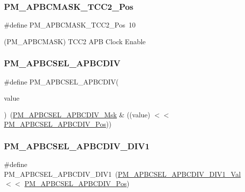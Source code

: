 \subsubsection{\texorpdfstring{PM\_APBCMASK\_TCC2\_Pos}{PM\_APBCMASK\_TCC2\_Pos}}
{\footnotesize\ttfamily \#define P\+M\+\_\+\+A\+P\+B\+C\+M\+A\+S\+K\+\_\+\+T\+C\+C2\+\_\+\+Pos~10}



(P\+M\+\_\+\+A\+P\+B\+C\+M\+A\+SK) T\+C\+C2 A\+PB Clock Enable 

\mbox{\label{group___s_a_m_d21___p_m_ga5f10c12c31b1fe15eee55ac128eaeb7e}} 
\subsubsection{\texorpdfstring{PM\_APBCSEL\_APBCDIV}{PM\_APBCSEL\_APBCDIV}}
{\footnotesize\ttfamily \#define P\+M\+\_\+\+A\+P\+B\+C\+S\+E\+L\+\_\+\+A\+P\+B\+C\+D\+IV(\begin{DoxyParamCaption}\item[{}]{value }\end{DoxyParamCaption})~(\mbox{\hyperlink{group___s_a_m_d21___p_m_ga2619287494a45aef81eafed63ea8463d}{P\+M\+\_\+\+A\+P\+B\+C\+S\+E\+L\+\_\+\+A\+P\+B\+C\+D\+I\+V\+\_\+\+Msk}} \& ((value) $<$$<$ \mbox{\hyperlink{group___s_a_m_d21___p_m_ga4a8379c87e542ce1f35e688187aac873}{P\+M\+\_\+\+A\+P\+B\+C\+S\+E\+L\+\_\+\+A\+P\+B\+C\+D\+I\+V\+\_\+\+Pos}}))}

\mbox{\label{group___s_a_m_d21___p_m_gad92a05127b3c70675bdaecd01e30c335}} 
\subsubsection{\texorpdfstring{PM\_APBCSEL\_APBCDIV\_DIV1}{PM\_APBCSEL\_APBCDIV\_DIV1}}
{\footnotesize\ttfamily \#define P\+M\+\_\+\+A\+P\+B\+C\+S\+E\+L\+\_\+\+A\+P\+B\+C\+D\+I\+V\+\_\+\+D\+I\+V1~(\mbox{\hyperlink{group___s_a_m_d21___p_m_ga765ff4e686958dbc7632b65e5f41e194}{P\+M\+\_\+\+A\+P\+B\+C\+S\+E\+L\+\_\+\+A\+P\+B\+C\+D\+I\+V\+\_\+\+D\+I\+V1\+\_\+\+Val}}   $<$$<$ \mbox{\hyperlink{group___s_a_m_d21___p_m_ga4a8379c87e542ce1f35e688187aac873}{P\+M\+\_\+\+A\+P\+B\+C\+S\+E\+L\+\_\+\+A\+P\+B\+C\+D\+I\+V\+\_\+\+Pos}})}

